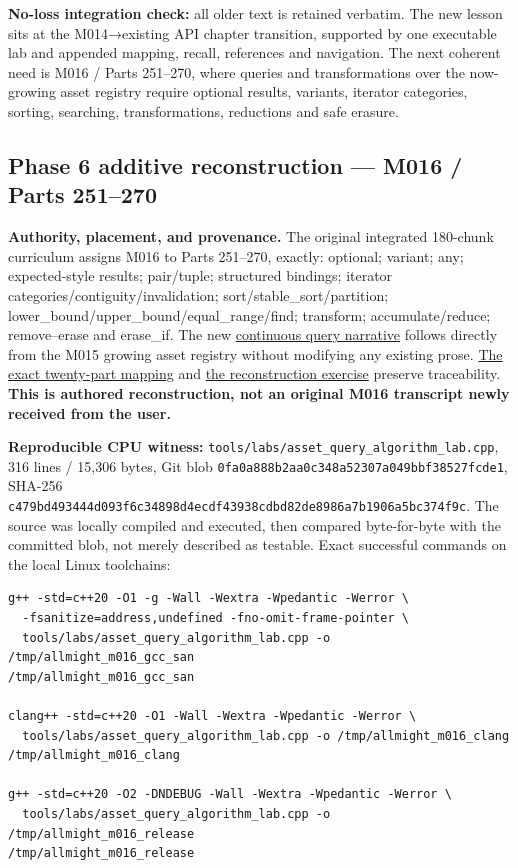 \textbf{No-loss integration check:} all older text is retained verbatim. The new lesson sits at the M014→existing API chapter transition, supported by one executable lab and appended mapping, recall, references and navigation. The next coherent need is M016 / Parts 251--270, where queries and transformations over the now-growing asset registry require optional results, variants, iterator categories, sorting, searching, transformations, reductions and safe erasure.

\subsection{Phase 6 additive reconstruction --- M016 / Parts 251--270}\label{appendix-a103e7846d21-phase-6-additive-reconstruction-m016-parts-251270}

\textbf{Authority, placement, and provenance.} The original integrated 180-chunk curriculum assigns M016 to Parts 251--270, exactly: optional; variant; any; expected-style results; pair/tuple; structured bindings; iterator categories/contiguity/invalidation; sort/stable\_sort/partition; lower\_bound/upper\_bound/equal\_range/find; transform; accumulate/reduce; remove--erase and erase\_if. The new \hyperref[01-foundations-i-ch006-from-a-living-asset-registry-to-reliable-queries-and-transformations]{continuous query narrative} follows directly from the M015 growing asset registry without modifying any existing prose. \hyperref[appendix-fd090d982a15-m016-parts-251270-the-asset-registry-becomes-a-query-and-transformation-pipeline]{The exact twenty-part mapping} and \hyperref[appendix-960160274237-query-the-registry-without-confusing-identity-and-a-snapshot-m016-reconstruction]{the reconstruction exercise} preserve traceability. \textbf{This is authored reconstruction, not an original M016 transcript newly received from the user.}

\textbf{Reproducible CPU witness:} \texttt{tools/labs/asset\_query\_algorithm\_lab.cpp}, 316 lines / 15,306 bytes, Git blob \texttt{0fa0a888b2aa0c348a52307a049bbf38527fcde1}, SHA-256 \texttt{c479bd493444d093f6c34898d4ecdf43938cdbd82de8986a7b1906a5bc374f9c}. The source was locally compiled and executed, then compared byte-for-byte with the committed blob, not merely described as testable. Exact successful commands on the local Linux toolchains:

\begin{verbatim}
g++ -std=c++20 -O1 -g -Wall -Wextra -Wpedantic -Werror \
  -fsanitize=address,undefined -fno-omit-frame-pointer \
  tools/labs/asset_query_algorithm_lab.cpp -o /tmp/allmight_m016_gcc_san
/tmp/allmight_m016_gcc_san

clang++ -std=c++20 -O1 -Wall -Wextra -Wpedantic -Werror \
  tools/labs/asset_query_algorithm_lab.cpp -o /tmp/allmight_m016_clang
/tmp/allmight_m016_clang

g++ -std=c++20 -O2 -DNDEBUG -Wall -Wextra -Wpedantic -Werror \
  tools/labs/asset_query_algorithm_lab.cpp -o /tmp/allmight_m016_release
/tmp/allmight_m016_release
\end{verbatim}

